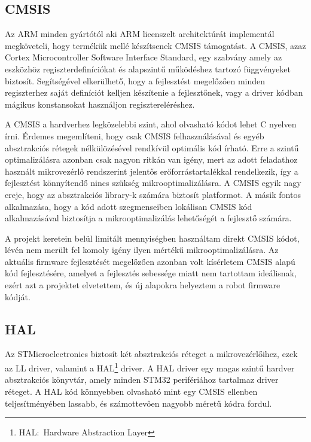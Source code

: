 \subsection{CMSIS}

Az ARM minden gyártótól aki ARM licenszelt architektúrát implementál
megköveteli, hogy termékük mellé készítsenek CMSIS támogatást. A
CMSIS, azaz Cortex Microcontroller Software Interface Standard, egy
szabvány amely az eszközhöz regiszterdefiníciókat és alapszintű
működéshez tartozó függvényeket biztosít. Segítségével elkerülhető,
hogy a fejlesztést megelőzően minden regiszterhez saját definíciót
kelljen készítenie a fejlesztőnek, vagy a driver kódban mágikus
konstansokat használjon regisztereléréshez.\cite{cmsis}

\medskip

A CMSIS a hardverhez legközelebbi szint, ahol olvasható kódot lehet C nyelven
írni. Érdemes megemlíteni, hogy csak CMSIS felhasználásával és egyéb absztrakciós
rétegek nélkülözésével rendkívül optimális kód írható. Erre a szintű
optimalizálásra azonban csak nagyon ritkán van igény, mert az adott feladathoz
használt mikrovezérlő rendszerint jelentős erőforrástartalékkal rendelkezik, így
a fejlesztést könnyítendő nincs szükség mikrooptimalizálásra. A CMSIS egyik nagy ereje,
hogy az absztrakciós library-k számára biztosít platformot. A másik fontos
alkalmazása, hogy a kód adott szegmenseiben lokálisan CMSIS kód alkalmazásával
biztosítja a mikrooptimalizálás lehetőségét a fejlesztő számára.

\medskip

A projekt keretein belül limitált mennyiségben használtam direkt CMSIS kódot,
lévén nem merült fel komoly igény ilyen mértékű mikrooptimalizálásra. Az aktuális
firmware fejlesztését megelőzően azonban volt kísérletem CMSIS alapú kód
fejlesztésére, amelyet a fejlesztés sebessége miatt nem tartottam ideálisnak,
ezért azt a projektet elvetettem, és új alapokra helyeztem a robot firmware
kódját.

\subsection{HAL}

Az STMicroelectronics biztosít két absztrakciós réteget a mikrovezérlőihez, ezek
az LL driver, valamint a HAL\footnote{HAL:~Hardware Abstraction Layer} driver. A HAL
driver egy magas szintű hardver absztrakciós könyvtár, amely minden STM32
perifériához tartalmaz driver réteget. A HAL kód könnyebben olvasható mint egy
CMSIS ellenben teljesítményében lassabb, és számottevően nagyobb méretű kódra
fordul.

